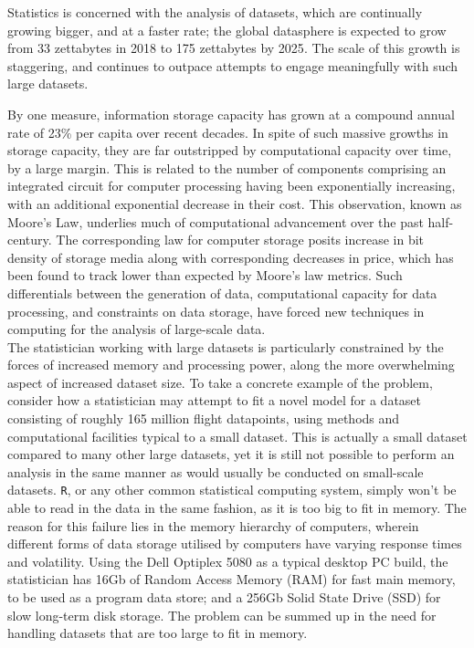 Statistics is concerned with the analysis of datasets, which are continually growing bigger, and at a faster rate;
the global datasphere is expected to grow from 33 zettabytes in 2018 to 175 zettabytes by 2025\cite{rydning2018digitization}.
The scale of this growth is staggering, and continues to outpace attempts to engage meaningfully with such large datasets.

By one measure, information storage capacity has grown at a compound annual rate of 23\% per capita over recent decades\cite{hilbert2011world}.
In spite of such massive growths in storage capacity, they are far outstripped by computational capacity over time, by a large margin\cite{fontana2018moore}.
This is related to the number of components comprising an integrated circuit for computer processing having been exponentially increasing, with an additional exponential decrease in their cost\cite{moore1975progress}.
This observation, known as Moore's Law, underlies much of computational advancement over the past half-century.
The corresponding law for computer storage posits increase in bit density of storage media along with corresponding decreases in price, which has been found to track lower than expected by Moore's law metrics.
Such differentials between the generation of data, computational capacity for data processing, and constraints on data storage, have forced new techniques in computing for the analysis of large-scale data.\\

The statistician working with large datasets is particularly constrained by the forces of increased memory and processing power, along the more overwhelming aspect of increased dataset size.
To take a concrete example of the problem, consider how a statistician may attempt to fit a novel model for a dataset consisting of roughly 165 million flight datapoints\cite{bot2009flights}, using methods and computational facilities typical to a small dataset.
This is actually a small dataset compared to many other large datasets, yet it is still not possible to perform an analysis in the same manner as would usually be conducted on small-scale datasets.
\texttt{R}, or any other common statistical computing system, simply won't be able to read in the data in the same fashion, as it is too big to fit in memory.
The reason for this failure lies in the memory hierarchy of computers, wherein different forms of data storage utilised by computers have varying response times and volatility.
Using the Dell Optiplex 5080 as a typical desktop PC build, the statistician has 16Gb of Random Access Memory (RAM) for fast main memory, to be used as a program data store; and a 256Gb Solid State Drive (SSD) for slow long-term disk  storage\cite{cornell2021standardcomp}.
The problem can be summed up in the need for handling datasets that are too large to fit in memory.

